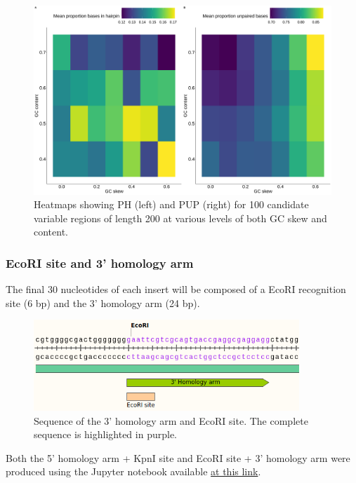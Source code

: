 \documentclass[11pt]{article}
\begin{document}
\begin{figure}[H]
	\includegraphics[width=14cm]{images/plots/rna_secondary_structure_temp.png}
	\centering
	\caption{Heatmaps showing PH (left) and PUP (right) for 100 candidate variable regions of length 200 at various levels of both GC skew and content.}
	\label{fig:3_prime_arm}
\end{figure}


\subsubsection{EcoRI site and 3' homology arm}

The final 30 nucleotides of each insert will be composed of a EcoRI recognition site (6 bp) and the 3' homology arm (24 bp). 

\begin{figure}[H]
	\includegraphics[width=10cm]{images/variable_region/3_homology_arm.png}
	\centering
	\caption{Sequence of the 3' homology arm and EcoRI site. The complete sequence is highlighted in purple.}
	\label{fig:3_prime_arm}
\end{figure}

Both the 5' homology arm + KpnI site and EcoRI site + 3' homology arm were produced using the Jupyter notebook available \href{https://github.com/EthanHolleman/plasmid-VR-design/blob/main/notes/homology_arms.ipynb}{at this link}.
\end{document}
